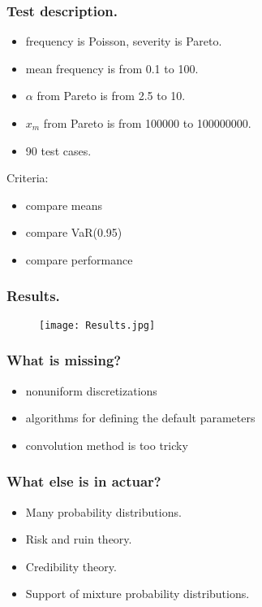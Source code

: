\documentclass{beamer}
\begin{document}
\begin{frame}[fragile]
\frametitle{Test description.}
\begin{itemize}
\item frequency is Poisson, severity is Pareto.
\item mean frequency is from 0.1 to 100.
\item $\alpha$ from Pareto is from 2.5 to 10.
\item $x_m$ from Pareto is from 100000 to 100000000.
\item 90 test cases.
\end{itemize}
Criteria:
\begin{itemize}
	\item compare means
  \item compare VaR(0.95)
  \item compare performance
\end{itemize}
\end{frame}
\begin{frame}[fragile]
\frametitle{Results.}
\begin{figure}[h!]
\centering
\texttt{[image: Results.jpg]}
\end{figure}
\end{frame}
\begin{frame}[fragile]
\frametitle{What is missing?}
\begin{itemize}
	\item nonuniform discretizations
  \item algorithms for defining the default parameters
	\item convolution method is too tricky
\end{itemize}
\end{frame}
\begin{frame}[fragile]
\frametitle{What else is in \textbf{actuar}?}
\begin{itemize}
\item Many probability distributions.
\item Risk and ruin theory.
\item Credibility theory.
\item Support of mixture probability distributions.
\end{itemize}
\end{frame}
\end{document}
